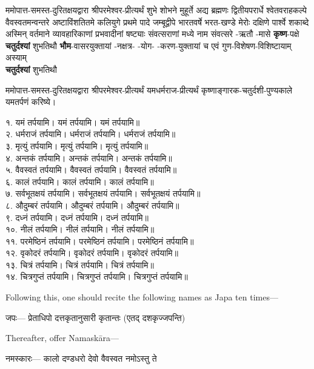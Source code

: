 \shuklambaradharam

\pranayama

ममोपात्त-समस्त-दुरितक्षयद्वारा श्रीपरमेश्वर-प्रीत्यर्थं शुभे शोभने मुहूर्ते अद्य ब्रह्मणः
द्वितीयपरार्धे श्वेतवराहकल्पे वैवस्वतमन्वन्तरे अष्टाविंशतितमे कलियुगे प्रथमे पादे
जम्बूद्वीपे भारतवर्षे भरत-खण्डे मेरोः दक्षिणे पार्श्वे शकाब्दे अस्मिन् वर्तमाने व्यावहारिकाणां
प्रभवादीनां षष्ट्याः संवत्सराणां मध्ये
\textbf{\blank{}} नाम संवत्सरे
\textbf{\ayane}
\textbf{\rtu}-ऋतौ
\textbf{\masa}-मासे
\textbf{कृष्ण}-पक्षे
\textbf{चतुर्दश्यां} शुभतिथौ
\textbf{भौम}-वासरयुक्तायां
\textbf{\nakshatra}-नक्षत्र-%
\textbf{\yoga}-योग-%
\textbf{\karana}-करण-युक्तायां
च एवं गुण-विशेषण-विशिष्टायाम् अस्याम्\\
\textbf{चतुर्दश्यां} शुभतिथौ

ममोपात्त-समस्त-दुरितक्षयद्वारा श्रीपरमेश्वर-प्रीत्यर्थं यमधर्मराज-प्रीत्यर्थं कृष्णाङ्गारक-चतुर्दशी-पुण्यकाले यमतर्पणं करिष्ये।


१. यमं तर्पयामि। यमं तर्पयामि। यमं तर्पयामि॥\\
२. धर्मराजं तर्पयामि। धर्मराजं तर्पयामि। धर्मराजं तर्पयामि॥\\
३. मृत्युं तर्पयामि। मृत्युं तर्पयामि। मृत्युं तर्पयामि॥\\
४. अन्तकं तर्पयामि। अन्तकं तर्पयामि। अन्तकं तर्पयामि॥\\
५. वैवस्वतं तर्पयामि। वैवस्वतं तर्पयामि। वैवस्वतं तर्पयामि॥\\
६. कालं तर्पयामि। कालं तर्पयामि। कालं तर्पयामि॥\\
७. सर्वभूतक्षयं तर्पयामि। सर्वभूतक्षयं तर्पयामि। सर्वभूतक्षयं तर्पयामि॥\\
८. औदुम्बरं तर्पयामि। औदुम्बरं तर्पयामि। औदुम्बरं तर्पयामि॥\\
९. दध्नं तर्पयामि। दध्नं तर्पयामि। दध्नं तर्पयामि॥\\
१०. नीलं तर्पयामि। नीलं तर्पयामि। नीलं तर्पयामि॥\\
११. परमेष्ठिनं तर्पयामि। परमेष्ठिनं तर्पयामि। परमेष्ठिनं तर्पयामि॥\\
१२. वृकोदरं तर्पयामि। वृकोदरं तर्पयामि। वृकोदरं तर्पयामि॥\\
१३. चित्रं तर्पयामि। चित्रं तर्पयामि। चित्रं तर्पयामि॥\\
१४. चित्रगुप्तं तर्पयामि। चित्रगुप्तं तर्पयामि। चित्रगुप्तं तर्पयामि॥

\closesection

{\sffamily Following this, one should recite the following names as Japa ten times—}

जपः—
{प्रेताधिपो दत्तकृतानुसारी कृतान्तः (एतद् दशकृज्जपन्ति)}

{\sffamily Thereafter, offer Namaskāra—}

नमस्कारः—
{कालो दण्डधरो देवो वैवस्वत नमोऽस्तु ते}

\closesection
